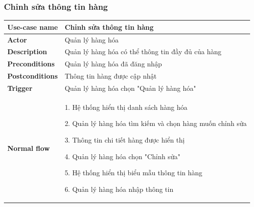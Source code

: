         \subsubsection{Chỉnh sửa thông tin hàng}
            \begin{longtable}{| p{} | p{} |} 
                \hline
                    \textbf{Use-case name} 
                & 
                    Chỉnh sửa thông tin hàng
                \\
                \hline
                    \textbf{Actor} 
                & 
                    Quản lý hàng hóa
                \\
                \hline
                    \textbf{Description} 
                & 
                    Quản lý hàng hóa có thể thông tin đầy đủ của hàng
                \\
                \hline
                    \textbf{Preconditions} 
                &
                    Quản lý hàng hóa đã đăng nhập
                \\
                \hline
                    \textbf{Postconditions} 
                & 
                    Thông tin hàng được cập nhật
                \\
                \hline
                    \textbf{Trigger} 
                & 
                    Quản lý hàng hóa chọn "Quản lý hàng hóa"
                \\
                \hline
                \begin{flushleft}
                    \textbf{Normal flow}
                \end{flushleft}
                & 
                1. Hệ thống hiển thị danh sách hàng hóa
                    
                    2. Quản lý hàng hóa tìm kiếm và chọn hàng muốn chỉnh sửa
                    
                    3. Thông tin chi tiết hàng được hiển thị
                    
                    4. Quản lý hàng hóa chọn "Chỉnh sửa"
                    
                    5. Hệ thống hiển thị biểu mẫu thông tin hàng
                    
                    6. Quản lý hàng hóa nhập thông tin
                    

\end{longtable}
